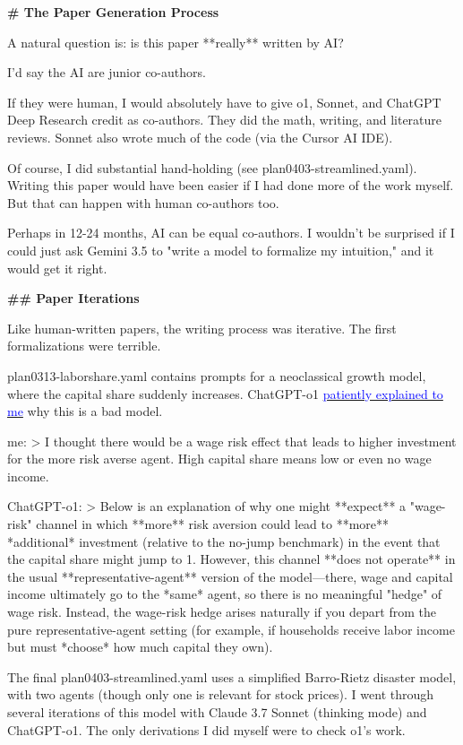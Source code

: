 \begin{mdframed}[linewidth=1pt, linecolor=black]
\textbf{\textcolor{red!70!black}{\# The Paper Generation Process}}

A natural question is: is this paper **really** written by AI? 

I’d say the AI are junior co-authors. 

If they were human, I would absolutely have to give o1, Sonnet, and ChatGPT Deep Research credit as co-authors. They did the math, writing, and literature reviews. Sonnet also wrote much of the code (via the Cursor AI IDE).

Of course, I did substantial hand-holding (see \colorbox{gray!10}{\textcolor{red!70!black}{plan0403-streamlined.yaml}}). Writing this paper would have been easier if I had done more of the work myself. But that can happen with human co-authors too. 

Perhaps in 12-24 months, AI can be equal co-authors. I wouldn’t be surprised if I could just ask Gemini 3.5 to "write a model to formalize my intuition," and it would get it right.

\textbf{\textcolor{red!70!black}{\#\# Paper Iterations}}

Like human-written papers, the writing process was iterative. The first formalizations were terrible. 

\colorbox{gray!10}{\textcolor{red!70!black}{plan0313-laborshare.yaml}} contains prompts for a neoclassical growth model, where the capital share suddenly increases. ChatGPT-o1 \href{https://chatgpt.com/share/67ee989a-50b4-800d-842f-ab71d2424c53}{\textcolor{blue}{patiently explained to me}} why this is a bad model.

me:
 > I thought there would be a wage risk effect that leads to higher investment for the more risk averse agent. High capital share means low or even no wage income.

ChatGPT-o1:
> Below is an explanation of why one might **expect** a "wage-risk" channel in which **more** risk aversion could lead to **more** *additional* investment (relative to the no-jump benchmark) in the event that the capital share might jump to 1. However, this channel **does not operate** in the usual **representative-agent** version of the model---there, wage and capital income ultimately go to the *same* agent, so there is no meaningful "hedge" of wage risk. Instead, the wage-risk hedge arises naturally if you depart from the pure representative-agent setting (for example, if households receive labor income but must *choose* how much capital they own).

The final \colorbox{gray!10}{\textcolor{red!70!black}{plan0403-streamlined.yaml}} uses a simplified Barro-Rietz disaster model, with two agents (though only one is relevant for stock prices). I went through several iterations of this model with Claude 3.7 Sonnet (thinking mode) and ChatGPT-o1. The only derivations I did myself were to check o1's work.


\end{mdframed}
